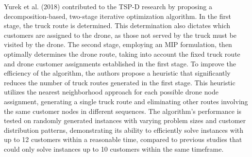 \documentclass{article}
\begin{document}
	Yurek et al. (2018) \cite{Yurek2018} contributed to the TSP-D research by proposing a decomposition-based, two-stage iterative optimization algorithm. In the first stage, the truck route is determined. This determination also dictates which customers are assigned to the drone, as those not served by the truck must be visited by the drone. The second stage, employing an MIP formulation, then optimally determines the drone route, taking into account the fixed truck route and drone customer assignments established in the first stage. To improve the efficiency of the algorithm, the authors propose a heuristic that significantly reduces the number of truck routes generated in the first stage. This heuristic utilizes the nearest neighborhood approach for each possible drone node assignment, generating a single truck route and eliminating other routes involving the same customer nodes in different sequences. The algorithm’s performance is tested on randomly generated instances with varying problem sizes and customer distribution patterns, demonstrating its ability to efficiently solve instances with up to 12 customers within a reasonable time, compared to previous studies that could only solve instances up to 10 customers within the same timeframe.
	
\end{document}
